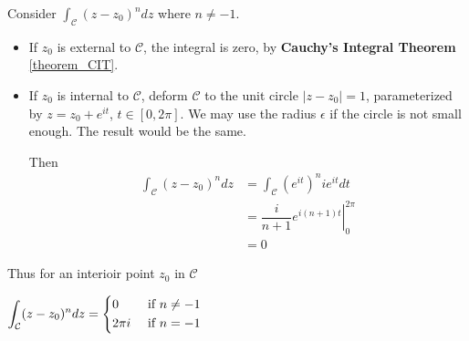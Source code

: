 \documentclass[12pt,titlepage]{article}
\begin{document}
Consider $\int_{\mathcal{C}} (z-z_0)^n dz$ where $n \neq -1$. \begin{itemize}
	\item If $z_0$ is external to $\mathcal{C}$, the integral is zero, by \textbf{Cauchy's Integral Theorem} \ref{theorem_CIT}. 
	\item If $z_0$ is internal to $\mathcal{C}$, deform $\mathcal{C}$ to the unit circle $|z - z_0| = 1$, parameterized by $z = z_0 + e^{it}$, $t \in [0,2\pi]$. We may use the radius $\epsilon$ if the circle is not small enough. The result would be the same. 
	
	Then \begin{align*}
		\int_{\mathcal{C}} (z-z_0)^n dz &= \int_{\mathcal{C}} \left(e^{it}\right)^n i e^{it} dt\\
		&= \left. \dfrac{i}{n+1} e^{i (n+1)t} \right|_0^{2\pi}\\
		&= 0
	\end{align*}
\end{itemize}
Thus for an interioir point $z_0$ in $\mathcal{C}$ \begin{tcolorbox}[hbox, before=\par\smallskip\centering]
	$\displaystyle\int_{\mathcal{C}} (z-z_0)^n dz = \begin{dcases}
		0 & \text{ if } n\neq -1\\
		2\pi i & \text{ if } n= -1
	\end{dcases}$
\end{tcolorbox}
\end{document}
